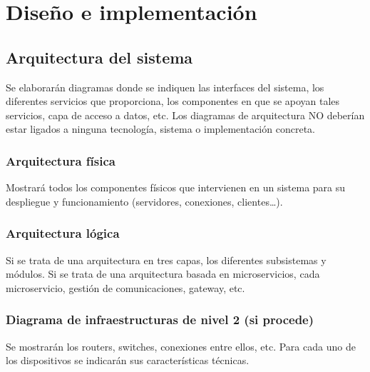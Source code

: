 \vspace*{-1cm}


\section{Diseño e implementación} %
\label{sec:diseno_e_implementacion}



\subsection{Arquitectura del sistema}
Se elaborarán diagramas donde se indiquen las interfaces del sistema, los diferentes servicios que proporciona, los componentes en que se apoyan tales servicios, capa de acceso a datos, etc. Los diagramas de arquitectura NO deberían estar ligados a ninguna tecnología, sistema o implementación concreta.

\subsubsection{Arquitectura física}
Mostrará todos los componentes físicos que intervienen en un sistema para su despliegue y funcionamiento (servidores, conexiones, clientes…).

\subsubsection{Arquitectura lógica}
Si se trata de una arquitectura en tres capas, los diferentes subsistemas y módulos. Si se trata de una arquitectura basada en microservicios, cada microservicio, gestión de comunicaciones, gateway, etc.

\subsubsection{Diagrama de infraestructuras de nivel 2 (si procede)}
Se mostrarán los routers, switches, conexiones entre ellos, etc. Para cada uno de los dispositivos se indicarán sus características técnicas.

